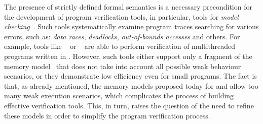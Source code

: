 The presence of strictly defined formal semantics is a necessary precondition for the development of program verification tools, in particular, tools for \emph{model checking}~\autocite{Baier:2008}.
Such tools systematically examine program traces searching for various errors, such as:
\emph{data races},
\emph{deadlocks},
\emph{out-of-bounds accesses} and others.
For example, tools like \genmc~\autocite{Kokologiannakis:CAD2021}
or \CDSChecker~\autocite{Norris-Demsky:OOPSLA2013} are able to perform verification of
multithreaded programs written in \CPP.
However, such tools either support only a fragment of the \CPP memory model~\autocite{Lahav-al:PLDI17} that does not take into account all possible weak behaviour scenarios, or they demonstrate low efficiency even for small programs.
The fact is that, as already mentioned, the memory models proposed today for \CPP and \Java allow too many
weak execution scenarios, which complicates the process of building effective verification tools. This, in turn, raises the question of the need to refine these models
in order to simplify the program verification process.

